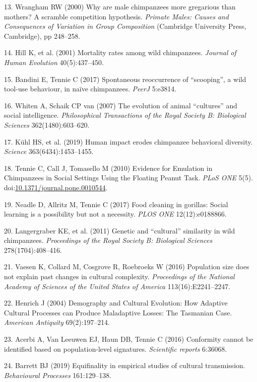 \documentclass[9pt,twocolumn,twoside,]{pnas-new}
\begin{document}
\hypertarget{ref-wrangham_why_2000}{}
13. Wrangham RW (2000) Why are male chimpanzees more gregarious than
mothers? A scramble competition hypothesis. \emph{Primate Males: Causes
and Consequences of Variation in Group Composition} (Cambridge
University Press, Cambridge), pp 248--258.

\hypertarget{ref-hill_mortality_2001}{}
14. Hill K, et al. (2001) Mortality rates among wild chimpanzees.
\emph{Journal of Human Evolution} 40(5):437--450.

\hypertarget{ref-bandini_spontaneous_2017}{}
15. Bandini E, Tennie C (2017) Spontaneous reoccurrence of ``scooping'',
a wild tool-use behaviour, in naïve chimpanzees. \emph{PeerJ} 5:e3814.

\hypertarget{ref-whiten_evolution_2007}{}
16. Whiten A, Schaik CP van (2007) The evolution of animal ``cultures''
and social intelligence. \emph{Philosophical Transactions of the Royal
Society B: Biological Sciences} 362(1480):603--620.

\hypertarget{ref-kuhl_human_2019}{}
17. Kühl HS, et al. (2019) Human impact erodes chimpanzee behavioral
diversity. \emph{Science} 363(6434):1453--1455.

\hypertarget{ref-tennie_evidence_2010}{}
18. Tennie C, Call J, Tomasello M (2010) Evidence for Emulation in
Chimpanzees in Social Settings Using the Floating Peanut Task.
\emph{PLoS ONE} 5(5).
doi:\href{https://doi.org/10.1371/journal.pone.0010544}{10.1371/journal.pone.0010544}.

\hypertarget{ref-neadle_food_2017}{}
19. Neadle D, Allritz M, Tennie C (2017) Food cleaning in gorillas:
Social learning is a possibility but not a necessity. \emph{PLOS ONE}
12(12):e0188866.

\hypertarget{ref-langergraber_genetic_2011}{}
20. Langergraber KE, et al. (2011) Genetic and ``cultural'' similarity
in wild chimpanzees. \emph{Proceedings of the Royal Society B:
Biological Sciences} 278(1704):408--416.

\hypertarget{ref-vaesen_population_2016}{}
21. Vaesen K, Collard M, Cosgrove R, Roebroeks W (2016) Population size
does not explain past changes in cultural complexity. \emph{Proceedings
of the National Academy of Sciences of the United States of America}
113(16):E2241--2247.

\hypertarget{ref-henrich_demography_2004}{}
22. Henrich J (2004) Demography and Cultural Evolution: How Adaptive
Cultural Processes can Produce Maladaptive Losses: The Tasmanian Case.
\emph{American Antiquity} 69(2):197--214.

\hypertarget{ref-acerbi_conformity_2016}{}
23. Acerbi A, Van Leeuwen EJ, Haun DB, Tennie C (2016) Conformity cannot
be identified based on population-level signatures. \emph{Scientific
reports} 6:36068.

\hypertarget{ref-barrett_equifinality_2019}{}
24. Barrett BJ (2019) Equifinality in empirical studies of cultural
transmission. \emph{Behavioural Processes} 161:129--138.



% 
\end{document}
